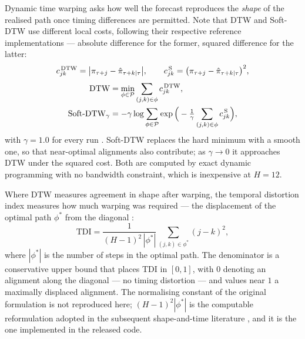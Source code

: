 \documentclass[12pt]{article}
\begin{document}
Dynamic time warping asks how well the forecast reproduces the \emph{shape} of
the realised path once timing differences are permitted. Note that DTW and
Soft-DTW use different local costs, following their respective reference
implementations --- absolute difference for the former, squared difference for
the latter:
\begin{equation}
    c^{\text{\,DTW}}_{jk} = \big|\pi_{\tau+j} - \hat{\pi}_{\tau+k|\tau}\big|,
    \qquad
    c^{\text{\,S}}_{jk} = \big(\pi_{\tau+j} - \hat{\pi}_{\tau+k|\tau}\big)^2 ,
\end{equation}
\begin{align}
    \text{DTW} &= \min_{\phi \in \mathcal{P}} \sum_{(j,k) \in \phi} c^{\text{\,DTW}}_{jk}, \\
    \text{Soft-DTW}_\gamma &= -\gamma \log \sum_{\phi \in \mathcal{P}}
        \exp\Big(-\tfrac{1}{\gamma} \sum_{(j,k) \in \phi} c^{\text{\,S}}_{jk}\Big),
\end{align}
with $\gamma = 1.0$ for every run \citep{sakoe1978, cuturi2017}. Soft-DTW
replaces the hard minimum with a smooth one, so that near-optimal alignments also
contribute; as $\gamma \to 0$ it approaches DTW under the squared cost. Both are
computed by exact dynamic programming with no bandwidth constraint, which is
inexpensive at $H = 12$.

Where DTW measures agreement in shape after warping, the temporal distortion
index measures how much warping was required --- the displacement of the optimal
path $\phi^\ast$ from the diagonal \citep{friasparedes2016}:
\begin{equation}
    \text{TDI} = \frac{1}{(H-1)^2 \, |\phi^\ast|}
        \sum_{(j,k) \in \phi^\ast} (j - k)^2 ,
\end{equation}
where $|\phi^\ast|$ is the number of steps in the optimal path. The denominator
is a conservative upper bound that places TDI in $[0,1]$, with $0$ denoting an
alignment along the diagonal --- no timing distortion --- and values near $1$ a
maximally displaced alignment. The normalising constant of the original
formulation is not reproduced here; $(H-1)^2 |\phi^\ast|$ is the computable
reformulation adopted in the subsequent shape-and-time literature
\citep{friasparedes2017, leguen2019}, and it is the one implemented in the
released code.
\end{document}
